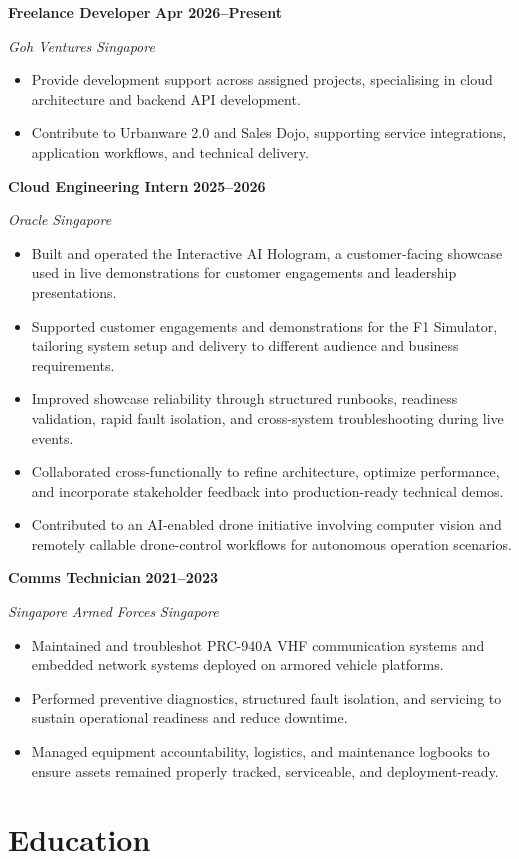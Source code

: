 \documentclass[10pt,a4paper]{article}
\newcommand{\role}[4]{%
  \textbf{#1} \hfill \textbf{#2}\par
  \textit{#3} \hfill \textit{#4}\par
}
\begin{document}
\role{Freelance Developer}{Apr 2026--Present}{Goh Ventures}{Singapore}
\begin{itemize}
  \item Provide development support across assigned projects, specialising in cloud architecture and backend API development.
  \item Contribute to Urbanware 2.0 and Sales Dojo, supporting service integrations, application workflows, and technical delivery.
\end{itemize}

\role{Cloud Engineering Intern}{2025--2026}{Oracle}{Singapore}
\begin{itemize}
  \item Built and operated the Interactive AI Hologram, a customer-facing showcase used in live demonstrations for customer engagements and leadership presentations.
  \item Supported customer engagements and demonstrations for the F1 Simulator, tailoring system setup and delivery to different audience and business requirements.
  \item Improved showcase reliability through structured runbooks, readiness validation, rapid fault isolation, and cross-system troubleshooting during live events.
  \item Collaborated cross-functionally to refine architecture, optimize performance, and incorporate stakeholder feedback into production-ready technical demos.
  \item Contributed to an AI-enabled drone initiative involving computer vision and remotely callable drone-control workflows for autonomous operation scenarios.
\end{itemize}

\role{Comms Technician}{2021--2023}{Singapore Armed Forces}{Singapore}
\begin{itemize}
  \item Maintained and troubleshot PRC-940A VHF communication systems and embedded network systems deployed on armored vehicle platforms.
  \item Performed preventive diagnostics, structured fault isolation, and servicing to sustain operational readiness and reduce downtime.
  \item Managed equipment accountability, logistics, and maintenance logbooks to ensure assets remained properly tracked, serviceable, and deployment-ready.
\end{itemize}

\section*{Education}
\end{document}
